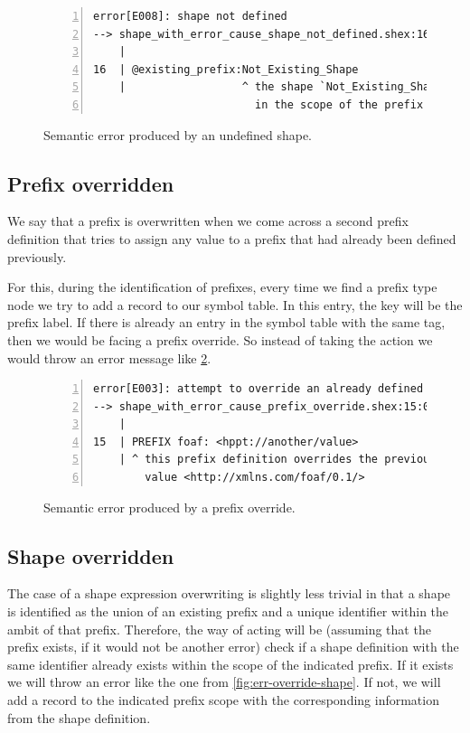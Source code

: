 \begin{figure}
    \begin{lstlisting}[numbers=left,basicstyle=\ttfamily\scriptsize]
error[E008]: shape not defined
--> shape_with_error_cause_shape_not_defined.shex:16:13
    |
16  | @existing_prefix:Not_Existing_Shape
    |                  ^ the shape `Not_Existing_Shape` has not been defined
                         in the scope of the prefix `existing_prefix`
    \end{lstlisting}
    \caption[Semantic error produced by an undefined shape]{Semantic error produced by an undefined shape.}
    \label{fig:err-non-def-shape}
\end{figure}

\subsection{Prefix overridden}
We say that a prefix is overwritten when we come across a second prefix definition that tries to assign any
value to a prefix that had already been defined previously.

For this, during the identification of prefixes, every time we find a prefix type node we try to add a record
to our symbol table. In this entry, the key will be the prefix label. If there is already an entry in the symbol
table with the same tag, then we would be facing a prefix override. So instead of taking the action we would
throw an error message like \cref{fig:err-override-prefix}.

\begin{figure}
    \begin{lstlisting}[numbers=left,basicstyle=\ttfamily\scriptsize]
error[E003]: attempt to override an already defined prefix
--> shape_with_error_cause_prefix_override.shex:15:0
    |
15  | PREFIX foaf: <hppt://another/value>
    | ^ this prefix definition overrides the previous one (9:0) with
        value <http://xmlns.com/foaf/0.1/>
    \end{lstlisting}
    \caption[Semantic error produced by a prefix override]{Semantic error produced by a prefix override.}
    \label{fig:err-override-prefix}
\end{figure}

\subsection{Shape overridden}
The case of a shape expression overwriting is slightly less trivial in that a shape is identified as the
union of an existing prefix and a unique identifier within the ambit of that prefix. Therefore, the way
of acting will be (assuming that the prefix exists, if it would not be another error) check if a shape
definition with the same identifier already exists within the scope of the indicated prefix. If it exists
we will throw an error like the one from \cref{fig:err-override-shape}. If not, we will add a record to the
indicated prefix scope with the corresponding information from the shape definition.

